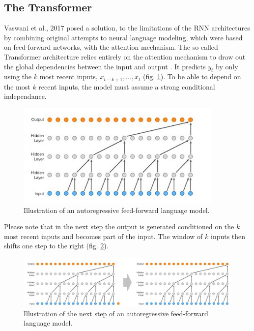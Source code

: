 \subsection{The Transformer}
Vaswani et al., 2017 \cite{vaswani2017attention} posed a solution, to the limitations of the RNN architectures by combining original attempts to neural language modeling, which were based on feed-forward networks, with the attention mechanism. The so called Transformer architecture relies entirely on the attention mechanism to draw out the global dependencies between the input and output \cite{illuaatte}. It predicts $y_t$ by only using the $k$ most recent inputs, $x_{t-k+1},...,x_t$ (fig. \ref{fig:feedforward0}). To be able to depend on the most $k$ recent inputs, the model must assume a strong conditional independance.
\begin{figure}[H]
    \centering
    \includegraphics[width=0.9\textwidth]{figures/feedforward0}
    \caption{Illustration of an autoregressive feed-forward language model. \cite{feedforward}}
    \label{fig:feedforward0}
\end{figure}
Please note that in the next step the output is generated conditioned on the $k$ most recent inputs and becomes part of the input. The window of $k$ inputs then shifts one step to the right (fig. \ref{fig:feedforward1}).
\begin{figure}[H]
    \centering
    \includegraphics[width=1.0\textwidth]{figures/feedforward1}
    \caption{Illustration of the next step of an autoregressive feed-forward language model. \cite{feedforward}}
    \label{fig:feedforward1}
\end{figure}
